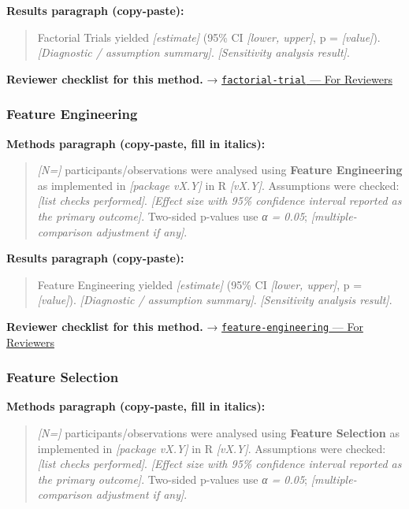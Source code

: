 \documentclass[
]{article}
\begin{document}
\textbf{Results paragraph (copy-paste):}

\begin{quote}
Factorial Trials yielded \emph{{[}estimate{]}} (95\% CI \emph{{[}lower,
upper{]}}, p = \emph{{[}value{]}}). \emph{{[}Diagnostic / assumption
summary{]}}. \emph{{[}Sensitivity analysis result{]}}.
\end{quote}

\textbf{Reviewer checklist for this method.} →
\href{../chapters/14-clinical/factorial-trial.Rmd\#for-reviewers}{\texttt{factorial-trial}
--- For Reviewers}

\subsubsection{Feature Engineering}\label{feature-engineering}

\textbf{Methods paragraph (copy-paste, fill in italics):}

\begin{quote}
\emph{{[}N={]}} participants/observations were analysed using
\textbf{Feature Engineering} as implemented in \emph{{[}package vX.Y{]}}
in R \emph{{[}vX.Y{]}}. Assumptions were checked: \emph{{[}list checks
performed{]}}. \emph{{[}Effect size with 95\% confidence interval
reported as the primary outcome{]}}. Two-sided p-values use \emph{α =
0.05}; \emph{{[}multiple-comparison adjustment if any{]}}.
\end{quote}

\textbf{Results paragraph (copy-paste):}

\begin{quote}
Feature Engineering yielded \emph{{[}estimate{]}} (95\% CI
\emph{{[}lower, upper{]}}, p = \emph{{[}value{]}}). \emph{{[}Diagnostic
/ assumption summary{]}}. \emph{{[}Sensitivity analysis result{]}}.
\end{quote}

\textbf{Reviewer checklist for this method.} →
\href{../chapters/13-ml/feature-engineering.Rmd\#for-reviewers}{\texttt{feature-engineering}
--- For Reviewers}

\subsubsection{Feature Selection}\label{feature-selection}

\textbf{Methods paragraph (copy-paste, fill in italics):}

\begin{quote}
\emph{{[}N={]}} participants/observations were analysed using
\textbf{Feature Selection} as implemented in \emph{{[}package vX.Y{]}}
in R \emph{{[}vX.Y{]}}. Assumptions were checked: \emph{{[}list checks
performed{]}}. \emph{{[}Effect size with 95\% confidence interval
reported as the primary outcome{]}}. Two-sided p-values use \emph{α =
0.05}; \emph{{[}multiple-comparison adjustment if any{]}}.
\end{quote}
\end{document}
